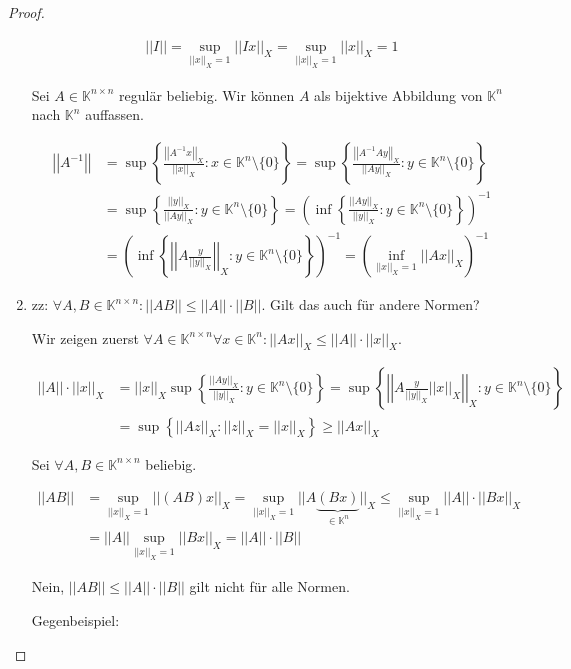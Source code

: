 \documentclass[]{article}
\newcommand{\norm}[1]{\left|\left|#1\right|\right|}
\newcommand{\normx}[1]{\norm{#1}_X}
\newcommand{\supo}{\sup_{\normx{x}=1}}
\begin{document}
\begin{proof}
\begin{enumerate}[label=\alph*)]
		\begin{align*}
			\norm{I}=\supo\normx{Ix}=\supo\normx{x}=1
		\end{align*}
	
		Sei $A \in \mathbb{K}^{n\times n}$ regulär beliebig. Wir können $A$ als bijektive Abbildung von $\mathbb{K}^n$ nach $\mathbb{K}^n$ auffassen.
		
		\begin{align*}
			\norm{A^{-1}} &= \sup\left\{\frac{\normx{A^{-1}x}}{\normx{x}}:x\in\mathbb{K}^n\setminus\{0\}\right\} = \sup\left\{\frac{\normx{A^{-1}Ay}}{\normx{Ay}}:y\in\mathbb{K}^n\setminus\{0\}\right\} \\
			&= \sup\left\{\frac{\normx{y}}{\normx{Ay}}:y\in\mathbb{K}^n\setminus\{0\}\right\} = \left(\inf\left\{\frac{\normx{Ay}}{\normx{y}}:y\in\mathbb{K}^n\setminus\{0\}\right\}\right)^{-1} \\
			&= \left(\inf\left\{\normx{A\frac{y}{\normx{y}}}:y\in\mathbb{K}^n\setminus\{0\}\right\}\right)^{-1} = \left(\inf_{\normx{x}=1}\normx{Ax}\right)^{-1}
		\end{align*}
	
		\item zz: $\forall A,B \in \mathbb{K}^{n\times n}: \norm{AB}\leq \norm{A}\cdot\norm{B}$. Gilt das auch für andere Normen?
		
		Wir zeigen zuerst $\forall A \in \mathbb{K}^{n\times n} \forall x \in \mathbb{K}^n: \normx{Ax} \leq \norm{A} \cdot \normx{x}$.
		
		\begin{align*}
			\norm{A}\cdot\normx{x} &= \normx{x} \sup\left\{\frac{\normx{Ay}}{\normx{y}}:y\in\mathbb{K}^n\setminus\{0\}\right\} = \sup\left\{\normx{A\frac{y}{\normx{y}}\normx{x}}:y\in\mathbb{K}^n\setminus\{0\}\right\} \\
			&= \sup\left\{\normx{Az}:\normx{z}=\normx{x}\right\} \geq \normx{Ax}
		\end{align*}
		
		Sei $\forall A,B \in \mathbb{K}^{n\times n}$ beliebig.
		
		\begin{align*}
			\norm{AB}&=\supo\normx{(AB)x}=\supo||A\underbrace{(Bx)}_{\in\mathbb{K}^n}||_X \leq \supo\norm{A}\cdot\normx{Bx} \\
			&= \norm{A}\supo\normx{Bx}=\norm{A}\cdot\norm{B}
		\end{align*}
	
		Nein, $\norm{AB} \leq \norm{A}\cdot \norm{B}$ gilt nicht für alle Normen.
		
		Gegenbeispiel:
		

\end{enumerate}
\end{proof}
\end{document}
